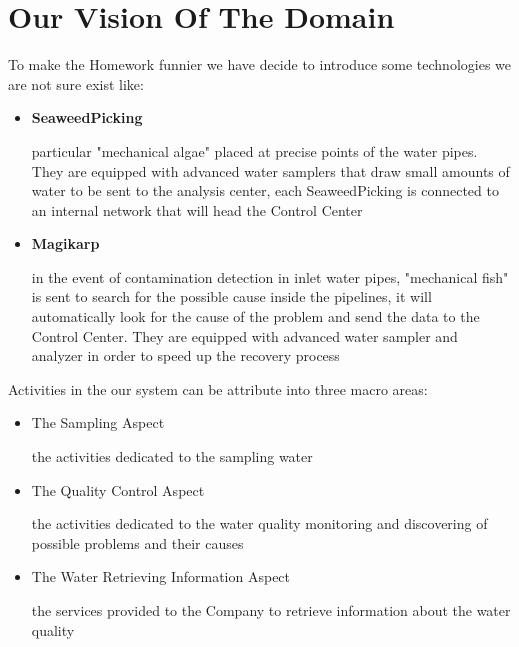 \chapter{\textbf{Our Vision Of The Domain}}
To make the Homework funnier we have decide to introduce some technologies we are not sure exist like:

\begin{itemize}
\item {\large \textbf{SeaweedPicking}}

\begin{description}
\par particular "mechanical algae" placed at precise points of the water pipes. They are equipped with advanced water samplers that draw small amounts of water to be sent to the analysis center, each SeaweedPicking is connected to an internal network that will head the Control Center
\end{description}

\item {\large \textbf{Magikarp}}

\begin{description}
\par in the event of contamination detection in inlet water pipes, "mechanical fish" is sent to search for the possible cause inside the pipelines, it will automatically look for the cause of the problem and send the data to the Control Center. They are equipped with advanced water sampler and analyzer in order to speed up the recovery process
\end{description}
 
\end{itemize}

Activities in the our system can be attribute into three macro areas:

\begin{itemize}

\item {The Sampling Aspect}
\begin{description}
the activities dedicated to the sampling water
\end{description}

\item {The Quality Control Aspect}
\begin{description}
the activities dedicated to the water quality monitoring and discovering of possible problems and their causes
\end{description}

\item {The Water Retrieving Information Aspect}
\begin{description}
the services provided to the Company to retrieve information about the water quality
\end{description}

\end{itemize}


